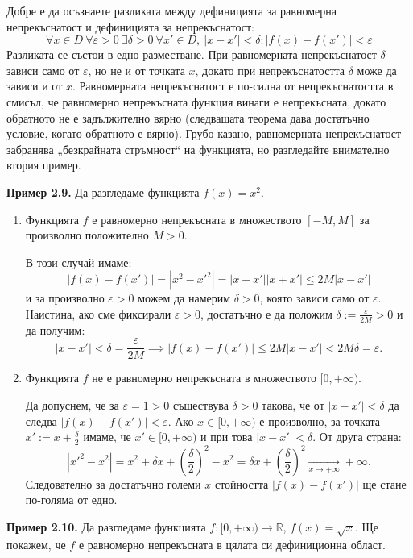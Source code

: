 Добре е да осъзнаете разликата между дефиницията за равномерна непрекъснатост и дефиницията за непрекъснатост:
\[
\forall x \in D\ \forall \varepsilon > 0\ \exists \delta > 0\ \forall x' \in D,\ |x - x'| < \delta : |f(x) - f(x')| < \varepsilon
\]
Разликата се състои в едно разместване. При равномерната непрекъснатост $\delta$ зависи само от $\varepsilon$, но не и от точката $x$, докато при непрекъснатостта $\delta$ може да зависи и от $x$. Равномерната непрекъснатост е по-силна от непрекъснатостта в смисъл, че равномерно непрекъсната функция винаги е непрекъсната, докато обратното не е задължително вярно (следващата теорема дава достатъчно условие, когато обратното е вярно). Грубо казано, равномерната непрекъснатост забранява „безкрайната стръмност“ на функцията, но разгледайте внимателно втория пример.

\noindent\textbf{Пример 2.9.} Да разгледаме функцията $f(x) = x^2$.
\begin{enumerate}
    \item Функцията $f$ е равномерно непрекъсната в множеството $[-M, M]$ за произволно положително $M > 0$.
    
    В този случай имаме:
    \[
    |f(x) - f(x')| = |x^2 - x'^2| = |x - x'||x + x'| \le 2M|x - x'|
    \]
    и за произволно $\varepsilon > 0$ можем да намерим $\delta > 0$, която зависи само от $\varepsilon$. Наистина, ако сме фиксирали $\varepsilon > 0$, достатъчно е да положим $\delta := \frac{\varepsilon}{2M} > 0$ и да получим:
    \[
    |x - x'| < \delta = \frac{\varepsilon}{2M} \implies |f(x) - f(x')| \le 2M|x - x'| < 2M\delta = \varepsilon.
    \]

    \item Функцията $f$ не е равномерно непрекъсната в множеството $[0, +\infty)$.
    
    Да допуснем, че за $\varepsilon = 1 > 0$ съществува $\delta > 0$ такова, че от $|x - x'| < \delta$ да следва $|f(x) - f(x')| < \varepsilon$. Ако $x \in [0, +\infty)$ е произволно, за точката $x' := x + \frac{\delta}{2}$ имаме, че $x' \in [0, +\infty)$ и при това $|x - x'| < \delta$. От друга страна:
    \[
    |x'^2 - x^2| = x^2 + \delta x + \left(\frac{\delta}{2}\right)^2 - x^2 = \delta x + \left(\frac{\delta}{2}\right)^2 \xrightarrow[x \to +\infty]{} +\infty.
    \]
    Следователно за достатъчно големи $x$ стойността $|f(x) - f(x')|$ ще стане по-голяма от едно.
\end{enumerate}

\noindent\textbf{Пример 2.10.} Да разгледаме функцията $f : [0, +\infty) \to \mathbb{R}$, $f(x) = \sqrt{x}$. Ще покажем, че $f$ е равномерно непрекъсната в цялата си дефиниционна област.

